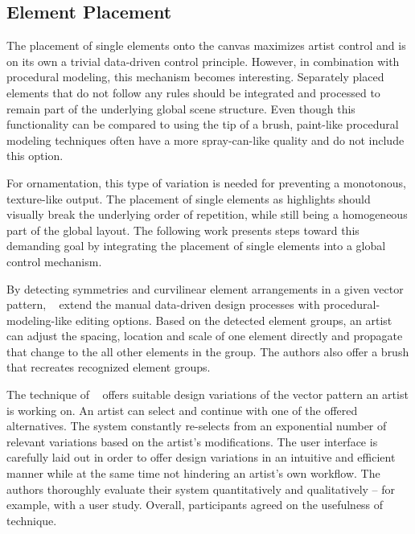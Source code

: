 \subsection{Element Placement}
\label{subsec:analysis_elementplacement}

The placement of single elements onto the canvas maximizes artist control and is on its own a trivial data-driven control principle. However, in combination with procedural modeling, this mechanism becomes interesting. Separately placed elements that do not follow any rules should be integrated and processed to remain part of the underlying global scene structure. Even though this functionality can be compared to using the tip of a brush, paint-like procedural modeling techniques often have a more spray-can-like quality \cite{mech_2012_tdf} and do not include this option.

For ornamentation, this type of variation is needed for preventing a monotonous, texture-like output. The placement of single elements as highlights should visually break the underlying order of repetition, while still being a homogeneous part of the global layout. The following work presents steps toward this demanding goal by integrating the placement of single elements into a global control mechanism.

By detecting symmetries and curvilinear element arrangements in a given vector pattern, \citeauthor*{yeh_2009_dsa}~\cite{yeh_2009_dsa} extend the manual data-driven design processes with procedural-modeling-like editing options. Based on the detected element groups, an artist can adjust the spacing, location and scale of one element directly and propagate that change to the all other elements in the group. The authors also offer a brush that recreates recognized element groups.

The technique of \citeauthor*{guerrero_2016_pep}~\cite{guerrero_2016_pep} offers suitable design variations of the vector pattern an artist is working on. An artist can select and continue with one of the offered alternatives. The system constantly re-selects from an exponential number of relevant variations based on the artist’s modifications. The user interface is carefully laid out in order to offer design variations in an intuitive and efficient manner while at the same time not hindering an artist’s own workflow. The authors thoroughly evaluate their system quantitatively and qualitatively – for example, with a user study. Overall, participants agreed on the usefulness of technique.


